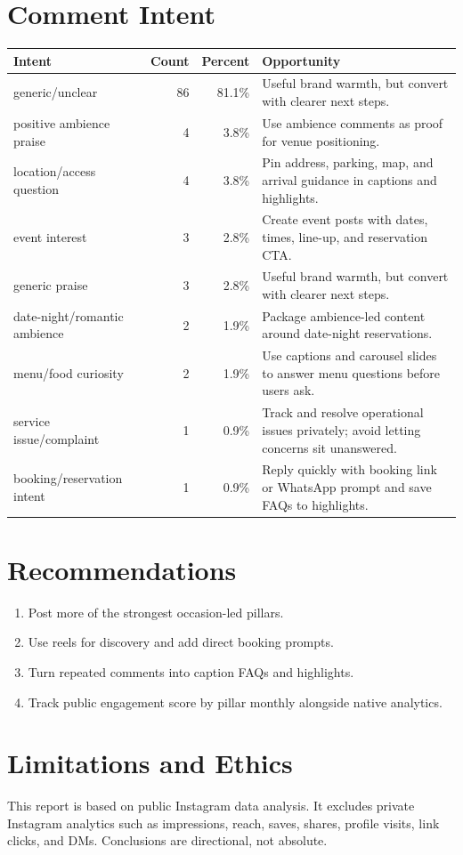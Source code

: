 \documentclass[11pt]{article}
\begin{document}
\section*{Comment Intent}
\begin{longtable}{p{}rrp{}}
Intent & Count & Percent & Opportunity \\ \hline
generic/unclear & 86 & 81.1\% & Useful brand warmth, but convert with clearer next steps. \\
positive ambience praise & 4 & 3.8\% & Use ambience comments as proof for venue positioning. \\
location/access question & 4 & 3.8\% & Pin address, parking, map, and arrival guidance in captions and highlights. \\
event interest & 3 & 2.8\% & Create event posts with dates, times, line-up, and reservation CTA. \\
generic praise & 3 & 2.8\% & Useful brand warmth, but convert with clearer next steps. \\
date-night/romantic ambience & 2 & 1.9\% & Package ambience-led content around date-night reservations. \\
menu/food curiosity & 2 & 1.9\% & Use captions and carousel slides to answer menu questions before users ask. \\
service issue/complaint & 1 & 0.9\% & Track and resolve operational issues privately; avoid letting concerns sit unanswered. \\
booking/reservation intent & 1 & 0.9\% & Reply quickly with booking link or WhatsApp prompt and save FAQs to highlights. \\
\end{longtable}
\section*{Recommendations}
\begin{enumerate}
\item Post more of the strongest occasion-led pillars.
\item Use reels for discovery and add direct booking prompts.
\item Turn repeated comments into caption FAQs and highlights.
\item Track public engagement score by pillar monthly alongside native analytics.
\end{enumerate}
\section*{Limitations and Ethics}
This report is based on public Instagram data analysis. It excludes private Instagram analytics such as impressions, reach, saves, shares, profile visits, link clicks, and DMs. Conclusions are directional, not absolute.
\end{document}
